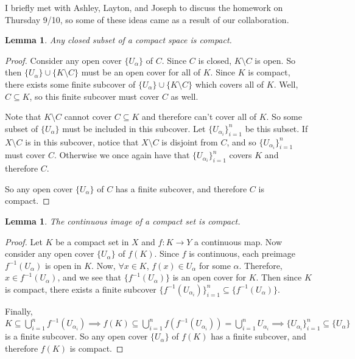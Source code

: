 \documentclass[addpoints,10pt]{exam}
\theoremstyle{plain}
\theoremstyle{definition}
\theoremstyle{plain}
\theoremstyle{plain}
\newtheorem{lem}[thm]{Lemma}
\theoremstyle{definition}
\begin{document}
I briefly met with Ashley, Layton, and Joseph to discuss the homework on Thursday 9/10, so some of these ideas came as a result of our collaboration.

\setcounter{thm}{0}
\begin{lem}\label{lem:hausclosedcompact}
  Any closed subset of a compact space is compact. 
\end{lem}
  \begin{proof}
    Consider any open cover $\{U_{\alpha}\}$ of $C$. Since $C$ is closed, $K\setminus{C}$ is open. So then $\{U_{\alpha}\}\cup \{K\setminus C\}$ must be an open cover for all of $K$. Since $K$ is compact, there exists some finite subcover of $\{U_{\alpha}\}\cup \{K\setminus C\}$ which covers all of $K$. Well, $C\subseteq K$, so this finite subcover must cover $C$ as well. 
    
    Note that $K\setminus C$ cannot cover $C\subseteq K$ and therefore can't cover all of $K$. So some subset of $\{U_{\alpha}\}$ must be included in this subcover. Let $\{U_{\alpha_{i}}\}_{i=1}^{n}$ be this subset. If $X\setminus C$ is in this subcover, notice that $X\setminus C$ is disjoint from $C$, and so $\{U_{\alpha_{i}}\}_{i=1}^{n}$ must cover $C$. Otherwise we once again have that $\{U_{\alpha_{i}}\}_{i=1}^{n}$ covers $K$ and therefore $C$. 
    
    So any open cover $\{U_{\alpha}\}$ of $C$ has a finite subcover, and therefore $C$ is compact.

  \end{proof}

\begin{lem}\label{lem:contimcom}
  The continuous image of a compact set is compact. 
\end{lem}
  \begin{proof}
    Let $K$ be a compact set in $X$ and $f:K\to Y$ a continuous map. Now consider any open cover $\{U_{\alpha}\}$ of $f(K)$. Since $f$ is continuous, each preimage $f^{-1}(U_{\alpha})$ is open in $K$. Now, $\forall x\in K$, $f(x)\in U_{\alpha}$ for some $\alpha$. Therefore, $x\in f^{-1}(U_{\alpha})$, and we see that $\{f^{-1}(U_{\alpha})\}$ is an open cover for $K$. Then since $K$ is compact, there exists a finite subcover $\{f^{-1}(U_{\alpha_{i}})\}_{i=1}^{n}\subseteq \{f^{-1}(U_{\alpha})\}$. 
    
    Finally, $K\subseteq \bigcup_{i=1}^{n} f^{-1}(U_{\alpha_{i}})\implies f(K)\subseteq \bigcup_{i=1}^{n}f(f^{-1}(U_{\alpha_{i}}))= \bigcup_{i=1}^{n}U_{\alpha_{i}}\implies \{U_{\alpha_{i}}\}_{i=1}^{n}\subseteq \{U_{\alpha}\}$ is a finite subcover. So any open cover $\{U_{\alpha}\}$ of $f(K)$ has a finite subcover, and therefore $f(K)$ is compact.

  \end{proof}
\end{document}
